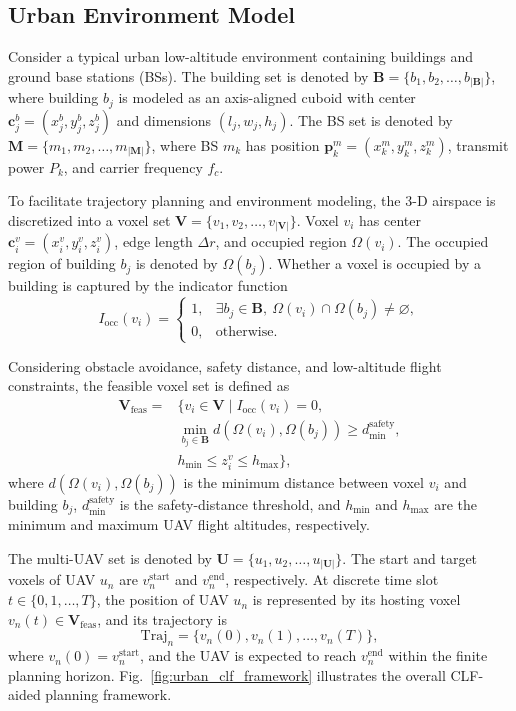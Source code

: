 \documentclass[lettersize,journal]{IEEEtran}
\begin{document}
\subsection{Urban Environment Model}

Consider a typical urban low-altitude environment containing buildings and ground base stations (BSs). The building set is denoted by $\mathbf{B}=\{b_1,b_2,\ldots,b_{|\mathbf{B}|}\}$, where building $b_j$ is modeled as an axis-aligned cuboid with center $\mathbf{c}_j^b=(x_j^b,y_j^b,z_j^b)$ and dimensions $(l_j,w_j,h_j)$. The BS set is denoted by $\mathbf{M}=\{m_1,m_2,\ldots,m_{|\mathbf{M}|}\}$, where BS $m_k$ has position $\mathbf{p}_k^m=(x_k^m,y_k^m,z_k^m)$, transmit power $P_k$, and carrier frequency $f_c$.

To facilitate trajectory planning and environment modeling, the 3-D airspace is discretized into a voxel set $\mathbf{V}=\{v_1,v_2,\ldots,v_{|\mathbf{V}|}\}$. Voxel $v_i$ has center $\mathbf{c}_i^v=(x_i^v,y_i^v,z_i^v)$, edge length $\Delta r$, and occupied region $\Omega(v_i)$. The occupied region of building $b_j$ is denoted by $\Omega(b_j)$. Whether a voxel is occupied by a building is captured by the indicator function
\begin{equation}
I_{\mathrm{occ}}(v_i)=
\begin{cases}
1, & \exists b_j\in\mathbf{B},\ \Omega(v_i)\cap\Omega(b_j)\neq\varnothing,\\
0, & \mathrm{otherwise}.
\end{cases}
\end{equation}

Considering obstacle avoidance, safety distance, and low-altitude flight constraints, the feasible voxel set is defined as
\begin{equation}
\begin{aligned}
\mathbf{V}_{\mathrm{feas}}=&\{v_i\in\mathbf{V}\mid I_{\mathrm{occ}}(v_i)=0,\\
&\min_{b_j\in\mathbf{B}}d(\Omega(v_i),\Omega(b_j))\ge d_{\min}^{\mathrm{safety}},\\
& h_{\min}\le z_i^v\le h_{\max}\},
\end{aligned}
\end{equation}
where $d(\Omega(v_i),\Omega(b_j))$ is the minimum distance between voxel $v_i$ and building $b_j$, $d_{\min}^{\mathrm{safety}}$ is the safety-distance threshold, and $h_{\min}$ and $h_{\max}$ are the minimum and maximum UAV flight altitudes, respectively.

The multi-UAV set is denoted by $\mathbf{U}=\{u_1,u_2,\ldots,u_{|\mathbf{U}|}\}$. The start and target voxels of UAV $u_n$ are $v_n^{\mathrm{start}}$ and $v_n^{\mathrm{end}}$, respectively. At discrete time slot $t\in\{0,1,\ldots,T\}$, the position of UAV $u_n$ is represented by its hosting voxel $v_n(t)\in\mathbf{V}_{\mathrm{feas}}$, and its trajectory is
\begin{equation}
\mathrm{Traj}_n=\{v_n(0),v_n(1),\ldots,v_n(T)\},
\end{equation}
where $v_n(0)=v_n^{\mathrm{start}}$, and the UAV is expected to reach $v_n^{\mathrm{end}}$ within the finite planning horizon. Fig.~\ref{fig:urban_clf_framework} illustrates the overall CLF-aided planning framework.
\end{document}
